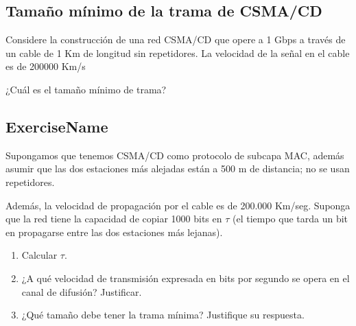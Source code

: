 \documentclass[12pt]{report}
\begin{document}
\begin{exer}
	\subsection{Tamaño mínimo de la trama de CSMA/CD \sthree}
	Considere la construcción de una red CSMA/CD que opere a 1 Gbps a través de un
	cable de 1 Km de longitud sin repetidores. La velocidad de la señal en el cable es de 200000 Km/s

	¿Cuál es el tamaño mínimo de trama?
\end{exer}

\begin{exer}
	\subsection{ExerciseName \sone}
	Supongamos que tenemos CSMA/CD como protocolo de subcapa MAC, además asumir que las dos estaciones más alejadas están a 500 m de distancia; no se usan repetidores.

	Además, la velocidad de propagación por el cable es de 200.000 Km/seg. Suponga que la red
	tiene la capacidad de copiar 1000 bits en $\tau$ (el tiempo que tarda un bit en propagarse entre las
	dos estaciones más lejanas).

	\begin{enumerate}
		\item Calcular $\tau$.
		\item ¿A qué velocidad de transmisión expresada en bits por segundo se opera en el canal de difusión? Justificar.
		\item ¿Qué tamaño debe tener la trama mínima? Justifique su respuesta.
	\end{enumerate}
\end{exer}
\end{document}
